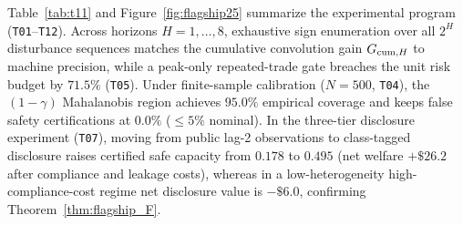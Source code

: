 Table~\ref{tab:t11} and Figure~\ref{fig:flagship25} summarize the experimental program (\texttt{T01}--\texttt{T12}). Across horizons $H=1,\ldots,8$, exhaustive sign enumeration over all $2^H$ disturbance sequences matches the cumulative convolution gain $G_{{\rm cum},H}$ to machine precision, while a peak-only repeated-trade gate breaches the unit risk budget by $71.5\%$ (\texttt{T05}). Under finite-sample calibration ($N=500$, \texttt{T04}), the $(1-\gamma)$ Mahalanobis region achieves $95.0\%$ empirical coverage and keeps false safety certifications at $0.0\%$ ($\le 5\%$ nominal). In the three-tier disclosure experiment (\texttt{T07}), moving from public lag-2 observations to class-tagged disclosure raises certified safe capacity from $0.178$ to $0.495$ (net welfare $+\$26.2$ after compliance and leakage costs), whereas in a low-heterogeneity high-compliance-cost regime net disclosure value is $-\$6.0$, confirming Theorem~\ref{thm:flagship_F}.
